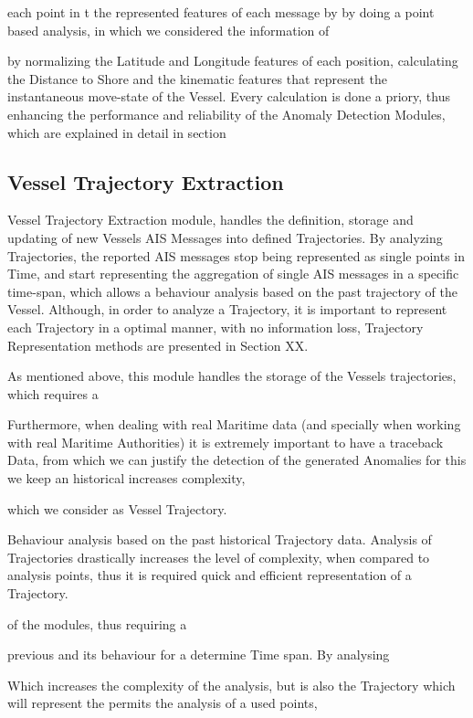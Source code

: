 each point in t the represented features of each message by by doing a point based analysis, in which we considered the information of  

by normalizing the Latitude and Longitude features of each position, calculating the Distance to Shore and the kinematic features that represent the instantaneous move-state of the Vessel. Every calculation is done a priory, thus enhancing the performance and reliability of the Anomaly Detection Modules, which are explained in detail in section 

\subsection{Vessel Trajectory Extraction}
Vessel Trajectory Extraction module, handles the definition, storage and updating of new Vessels AIS Messages into defined Trajectories.
By analyzing Trajectories, the reported AIS messages stop being represented as single points in Time, and start representing the aggregation of single AIS messages in a specific time-span, which allows a behaviour analysis based on the past trajectory of the Vessel. Although, in order to analyze a Trajectory, it is important to represent each Trajectory in a optimal manner, with no information loss, Trajectory Representation methods are presented in Section XX.  

As mentioned above, this module handles the storage of the Vessels trajectories, which requires a  

Furthermore, when dealing with real Maritime data (and specially when working with real Maritime Authorities) it is extremely important to have a traceback Data, from which we can justify the detection of the generated Anomalies for this we keep an historical 
increases complexity, 


which we consider as Vessel Trajectory. 

Behaviour analysis based on the past historical Trajectory data. Analysis of Trajectories drastically increases the level of complexity, when compared to analysis points, thus it is required quick and efficient representation of a Trajectory.


of the modules, thus requiring a 

previous  and its behaviour for a determine Time span. By analysing   

Which increases the complexity of the analysis, but is also the 
Trajectory which will represent the   permits the analysis of a used points,   


